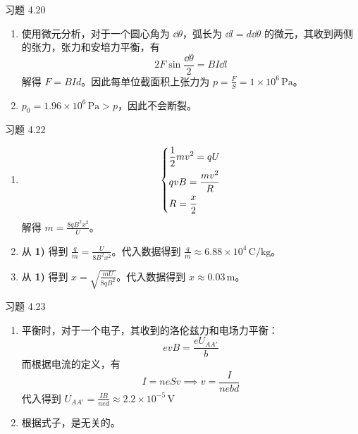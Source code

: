\begin{problem}
	习题 4.20
	\begin{solution}
		\begin{enumerate}
			\item[\textbf{1)}] 使用微元分析，对于一个圆心角为 $\dd{\theta}$，弧长为 $\dd{l} = d \dd{\theta}$ 的微元，其收到两侧的张力，张力和安培力平衡，有
			$$
			2 F \sin \frac{\dd{\theta}}{2} = B I \dd{l}
			$$
			解得 $F = B I d$。因此每单位截面积上张力为 $p = \frac{F}{S} = 1 \times 10^{6} \,\mathrm{Pa}$。

			\item[\textbf{2)}] $p_0 = 1.96 \times 10^{6} \,\mathrm{Pa} > p$，因此不会断裂。
		\end{enumerate}
	\end{solution}
\end{problem}

\begin{problem}
	习题 4.22
	\begin{solution}
		\begin{enumerate}
			\item[\textbf{1)}]
			$$
			\begin{dcases}
				\frac{1}{2} m v^2 = q U \\
				q v B = \frac{m v^2}{R} \\
				R = \frac{x}{2}
			\end{dcases}
			$$
			解得 $m = \frac{8 q B^2 x^2}{U}$。

			\item[\textbf{2)}] 从 \textbf{1)} 得到 $\frac{q}{m} = \frac{U}{8 B^2 x^2}$。代入数据得到 $\frac{q}{m} \approx 6.88 \times 10^{4} \,\mathrm{C / kg}$。

			\item[\textbf{3)}] 从 \textbf{1)} 得到 $x = \sqrt{\frac{m U}{8 q B^2}}$。代入数据得到 $x \approx 0.03 \,\mathrm{m}$。
		\end{enumerate}
	\end{solution}
\end{problem}

\begin{problem}
	习题 4.23
	\begin{solution}
		\begin{enumerate}
			\item[\textbf{1)}] 平衡时，对于一个电子，其收到的洛伦兹力和电场力平衡：
			$$
			e v B = \frac{e U_{AA'}}{b}
			$$
			而根据电流的定义，有
			$$
			I = n e S v \implies v = \frac{I}{n e b d}
			$$
			代入得到 $U_{AA'} = \frac{I B}{n e d} \approx 2.2 \times 10^{-5} \,\mathrm{V}$

			\item[\textbf{2)}] 根据式子，是无关的。
		\end{enumerate}
	\end{solution}
\end{problem}

